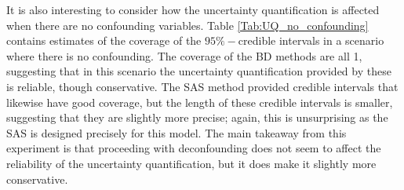 \documentclass[11pt]{article}
\numberwithin{equation}{section}
\begin{document}
It is also interesting to consider how the uncertainty quantification is affected when there are no confounding variables. Table \ref{Tab:UQ_no_confounding} contains estimates of the coverage of the $95\%-$credible intervals in a scenario where there is no confounding. The  coverage of the BD methods are all 1, suggesting that in this scenario the uncertainty quantification provided by these is reliable, though conservative. The SAS method provided credible intervals that likewise have good coverage, but the length of these credible intervals is smaller, suggesting that they are slightly more precise; again, this is unsurprising as the SAS is designed precisely for this model. The main takeaway from this experiment is that proceeding with deconfounding does not seem to affect the reliability of the uncertainty quantification, but it does make it slightly more conservative.
\end{document}
